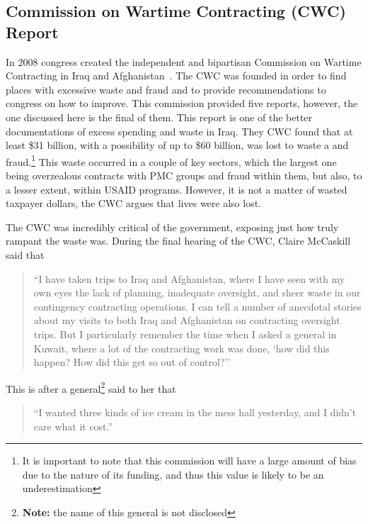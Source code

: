 \documentclass[12pt, draft]{article}
\begin{document}
    \subsection{Commission on Wartime Contracting (CWC) Report}
        In 2008 congress created the independent and bipartisan Commission on Wartime Contracting in Iraq and Afghanistan~\parencite{CWC_2011}. The CWC was founded in order to find places with excessive waste and fraud and to provide recommendations to congress on how to improve. This commission provided five reports, however, the one discussed here is the final of them. This report is one of the better documentations of excess spending and waste in Iraq. They CWC found that at least \$31 billion, with a possibility of up to \$60 billion, was lost to waste a and fraud.\footnote{It is important to note that this commission will have a large amount of bias due to the nature of its funding, and thus this value is likely to be an underestimation} 
        This waste occurred in a couple of key sectors, which the largest one being overzealous contracts with PMC groups and fraud within them, but also, to a lesser extent, within USAID programs. However, it is not a matter of wasted taxpayer dollars, the CWC argues that lives were also lost. 
        
        The CWC was incredibly critical of the government, exposing just how truly rampant the waste was. During the final hearing of the CWC, Claire McCaskill said that 
        
        \begin{quote}
            ``I have taken trips to Iraq and Afghanistan, where I have seen with my own eyes the lack of planning, inadequate oversight, and sheer waste in our contingency contracting operations. I can tell a number of anecdotal stories about my visits to both Iraq and Afghanistan on contracting oversight trips. But I particularly remember the time when I asked a general in Kuwait, where a lot of the contracting work was done, `how did this happen? How did this get so out of control?''~\parencite{us_senate2011wartime_contracting}
        \end{quote}

        This is after a general\footnote{\textbf{Note:} the name of this general is not disclosed} said to her that 

        \begin{quote}
            ``I wanted three kinds of ice cream in the mess hall yesterday, and I didn't care what it cost.''~\parencite{us_senate2011wartime_contracting}
        \end{quote}
\end{document}
